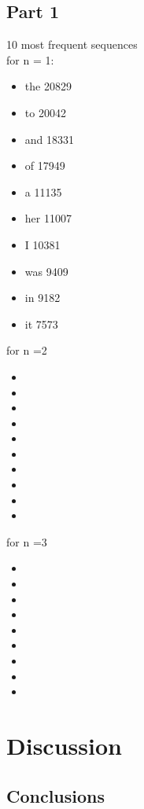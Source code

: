 \documentclass[final,12pt]{elsarticle}
\begin{document}
\subsection{Part 1}
10 most frequent sequences \\ for n = 1: 
\begin{itemize}
\item the 20829
\item to 20042
\item and 18331 
\item of 17949
\item a 11135
\item her 11007
\item I 10381
\item was 9409
\item in 9182 
\item it 7573
\end{itemize}
for n =2 
\begin{itemize}
\item 
\item 
\item 
\item 
\item 
\item 
\item 
\item 
\item 
\item 
\end{itemize}
for n =3
\begin{itemize}
\item 
\item
\item
\item
\item
\item
\item
\item
\item
\end{itemize}
\section{Discussion}
\subsection{Conclusions}
\end{document}
